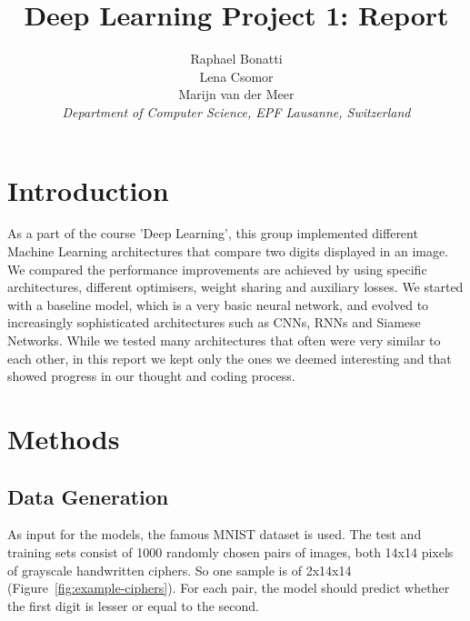 \documentclass[10pt,conference,compsocconf]{IEEEtran}
\begin{document}
\title{Deep Learning Project 1: Report}

\author{
  Raphael Bonatti\\
  Lena Csomor\\
  Marijn van der Meer\\
  \textit{Department of Computer Science, EPF Lausanne, Switzerland}
}

\maketitle

\section{Introduction}
As a part of the course 'Deep Learning', this group implemented different Machine Learning architectures that compare two digits displayed in an image. We compared the performance improvements are achieved by using specific architectures, different optimisers, weight sharing and auxiliary losses. We started with a baseline model, which is a very basic neural network, and evolved to increasingly sophisticated architectures such as CNNs, RNNs and Siamese Networks. While we tested many architectures that often were very similar to each other, in this report we kept only the ones we deemed interesting and that showed progress in our thought and coding process.

\section{Methods}\label{sec:models-methods}
\subsection{Data Generation}
\label{subsec:data-generation}
As input for the models, the famous MNIST dataset is used. The test and training sets consist of 1000 randomly chosen pairs of images, both 14x14 pixels of grayscale handwritten ciphers. So one sample is of 2x14x14 (Figure~\ref{fig:example-ciphers}). For each pair, the model should predict whether the first digit is lesser or equal to the second. 
\end{document}
